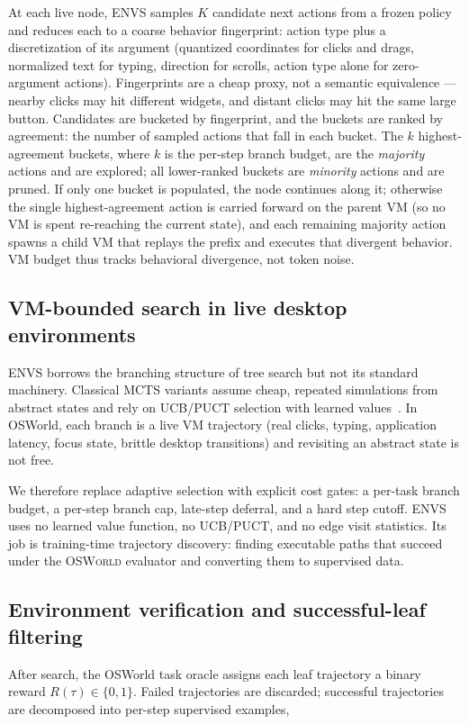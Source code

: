 \documentclass[11pt]{article}
\begin{document}
At each live node, ENVS samples $K$ candidate next actions from a frozen policy and reduces each to a coarse behavior fingerprint: action type plus a discretization of its argument (quantized coordinates for clicks and drags, normalized text for typing, direction for scrolls, action type alone for zero-argument actions). Fingerprints are a cheap proxy, not a semantic equivalence --- nearby clicks may hit different widgets, and distant clicks may hit the same large button. Candidates are bucketed by fingerprint, and the buckets are ranked by agreement: the number of sampled actions that fall in each bucket. The $k$ highest-agreement buckets, where $k$ is the per-step branch budget, are the \emph{majority} actions and are explored; all lower-ranked buckets are \emph{minority} actions and are pruned. If only one bucket is populated, the node continues along it; otherwise the single highest-agreement action is carried forward on the parent VM (so no VM is spent re-reaching the current state), and each remaining majority action spawns a child VM that replays the prefix and executes that divergent behavior. VM budget thus tracks behavioral divergence, not token noise.

\subsection{VM-bounded search in live desktop environments}
ENVS borrows the branching structure of tree search but not its standard machinery. Classical MCTS variants assume cheap, repeated simulations from abstract states and rely on UCB/PUCT selection with learned values~\citep{coulom2006mcts,kocsis2006uct,silver2016alphago,silver2017alphazero,schrittwieser2020muzero}. In OSWorld, each branch is a live VM trajectory (real clicks, typing, application latency, focus state, brittle desktop transitions) and revisiting an abstract state is not free.

We therefore replace adaptive selection with explicit cost gates: a per-task branch budget, a per-step branch cap, late-step deferral, and a hard step cutoff. ENVS uses no learned value function, no UCB/PUCT, and no edge visit statistics. Its job is training-time trajectory discovery: finding executable paths
that succeed under the \textsc{OSWorld} evaluator and converting them to supervised data.

\subsection{Environment verification and successful-leaf filtering}
After search, the OSWorld task oracle assigns each leaf trajectory a binary reward $R(\tau) \in \{0,1\}$. Failed trajectories are discarded; successful trajectories are decomposed into per-step supervised examples,
\end{document}
